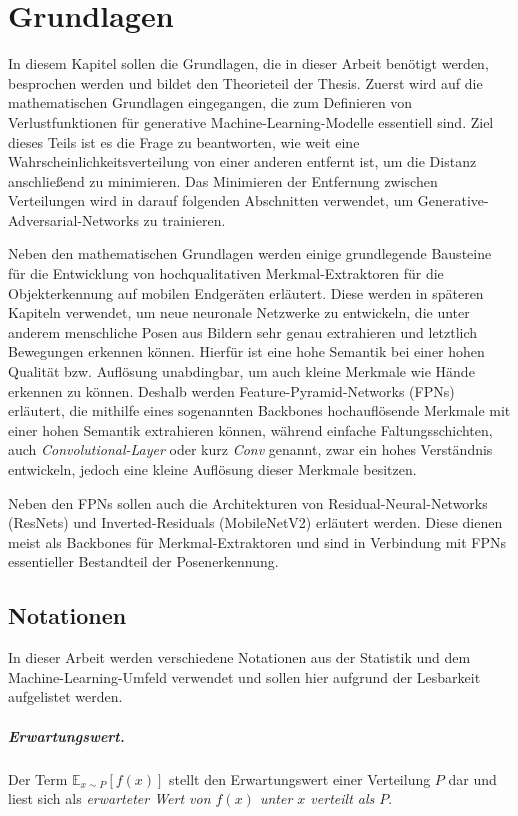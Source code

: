 \chapter{Grundlagen}\label{chapter:basics}
In diesem Kapitel sollen die Grundlagen, die in dieser Arbeit benötigt werden,
besprochen werden und bildet den Theorieteil der Thesis. Zuerst wird auf die
mathematischen Grundlagen eingegangen, die zum Definieren von Verlustfunktionen
für generative Machine-Learning-Modelle essentiell sind. Ziel dieses Teils ist
es die Frage zu beantworten, wie weit eine Wahrscheinlichkeitsverteilung von
einer anderen entfernt ist, um die Distanz anschließend zu minimieren. Das
Minimieren der Entfernung zwischen Verteilungen wird in darauf folgenden
Abschnitten verwendet, um Generative-Adversarial-Networks zu trainieren.

Neben den mathematischen Grundlagen werden einige grundlegende Bausteine für die
Entwicklung von hochqualitativen Merkmal-Extraktoren für die Objekterkennung auf
mobilen Endgeräten erläutert. Diese werden in späteren Kapiteln verwendet, um
neue neuronale Netzwerke zu entwickeln, die unter anderem menschliche Posen aus
Bildern sehr genau extrahieren und letztlich Bewegungen erkennen können. Hierfür
ist eine hohe Semantik bei einer hohen Qualität bzw. Auflösung unabdingbar, um
auch kleine Merkmale wie Hände erkennen zu können. Deshalb werden
Feature-Pyramid-Networks (FPNs) erläutert, die mithilfe eines sogenannten
Backbones hochauflösende Merkmale mit einer hohen Semantik extrahieren können,
während einfache Faltungsschichten, auch \textit{Convolutional-Layer} oder kurz
\textit{Conv} genannt, zwar ein hohes
Verständnis entwickeln, jedoch eine kleine Auflösung dieser Merkmale besitzen.

Neben den FPNs sollen auch die Architekturen von Residual-Neural-Networks
(ResNets) und Inverted-Residuals (MobileNetV2) erläutert werden. Diese dienen
meist als Backbones für Merkmal-Extraktoren und sind in Verbindung
mit FPNs essentieller Bestandteil der Posenerkennung.

\section{Notationen}
In dieser Arbeit werden verschiedene Notationen aus der Statistik und dem
Machine-Learning-Umfeld verwendet und sollen hier aufgrund der Lesbarkeit
aufgelistet werden.

\paragraph{Erwartungswert.}
Der Term $\mathbb{E}_{x \sim P}\left[f(x)\right]$ stellt den Erwartungswert
einer Verteilung $P$ dar und liest sich als \textit{erwarteter Wert von
$f(x)$ unter $x$ verteilt als $P$}.

